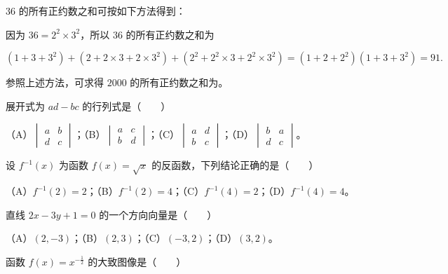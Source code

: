 \begin{question}
$36$ 的所有正约数之和可按如下方法得到：

因为 $36=2^2\times3^2$，所以 $36$ 的所有正约数之和为

\nopagebreak[4]
\[(1+3+3^2)+(2+2\times3+2\times3^2)+(2^2+2^2\times3+2^2\times3^2)=(1+2+2^2)(1+3+3^2)=91.\]

参照上述方法，可求得 $2000$ 的所有正约数之和为\gkblank{}。

\end{question}

\begin{question}
展开式为 $ad-bc$ 的行列式是\mbox{（　　）}

（A）$\begin{vmatrix}a&b\\d&c\end{vmatrix}$；（B）$\begin{vmatrix}a&c\\b&d\end{vmatrix}$；（C）$\begin{vmatrix}a&d\\b&c\end{vmatrix}$；（D）$\begin{vmatrix}b&a\\d&c\end{vmatrix}$。

\end{question}
\begin{question}
设 $f^{-1}(x)$ 为函数 $f(x)=\sqrt x$ 的反函数，下列结论正确的是\mbox{（　　）}

（A）$f^{-1}(2)=2$；（B）$f^{-1}(2)=4$；（C）$f^{-1}(4)=2$；（D）$f^{-1}(4)=4$。

\end{question}
\begin{question}
直线 $2x-3y+1=0$ 的一个方向向量是\mbox{（　　）}

（A）$(2,-3)$；（B）$(2,3)$；（C）$(-3,2)$；（D）$(3,2)$。

\Needspace{0.4\textheight}
\end{question}
\begin{question}
函数 $f(x)=x^{-\frac12}$ 的大致图像是\mbox{（　　）}
\nopagebreak[4]
\begin{center}\end{center}
\nopagebreak[4]
\end{question}
